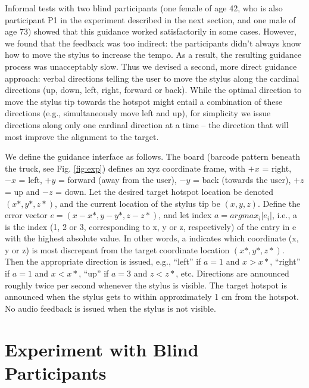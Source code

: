 \documentclass[runningheads]{res/templates/llncs}
\begin{document}
Informal tests with two blind participants (one female of age 42, who is
also participant P1 in the experiment described in the next section, and
one male of age 73) showed that this guidance worked satisfactorily in
some cases. However, we found that the feedback was too indirect: the
participants didn't always know how to move the stylus to increase the
tempo. As a result, the resulting guidance process was unacceptably
slow. Thus we devised a second, more direct guidance approach: verbal
directions telling the user to move the stylus along the cardinal
directions (up, down, left, right, forward or back). While the optimal
direction to move the stylus tip towards the hotspot might entail a
combination of these directions (e.g., simultaneously move left and up),
for simplicity we issue directions along only one cardinal direction at
a time -- the direction that will most improve the alignment to the
target.

We define the guidance interface as follows. The board (barcode pattern
beneath the truck, see Fig. \ref{fig:exp}) defines an xyz coordinate frame,
with \(+x\) = right, \(-x\) = left, \(+y\) = forward (away from the
user), \(-y\) = back (towards the user), \(+z\) = up and \(-z\) = down.
Let the desired target hotspot location be denoted \((x*, y*, z*)\), and
the current location of the stylus tip be \((x,y,z)\). Define the error
vector \(e = (x-x*, y-y*, z-z*)\), and let index \(a = argmax_i |e_i|\),
i.e., a is the index (1, 2 or 3, corresponding to x, y or z,
respectively) of the entry in e with the highest absolute value. In
other words, a indicates which coordinate (x, y or z) is most discrepant
from the target coordinate location \((x*, y*, z*)\). Then the
appropriate direction is issued, e.g., ``left'' if \(a = 1\) and
\(x > x*\), ``right'' if \(a = 1\) and \(x < x*\), ``up'' if \(a = 3\)
and \(z < z*\), etc. Directions are announced roughly twice per second
whenever the stylus is visible. The target hotspot is announced when the
stylus gets to within approximately 1 cm from the hotspot. No audio
feedback is issued when the stylus is not visible.

\hypertarget{exp}{%
\section{Experiment with Blind Participants}\label{exp}}
\end{document}
